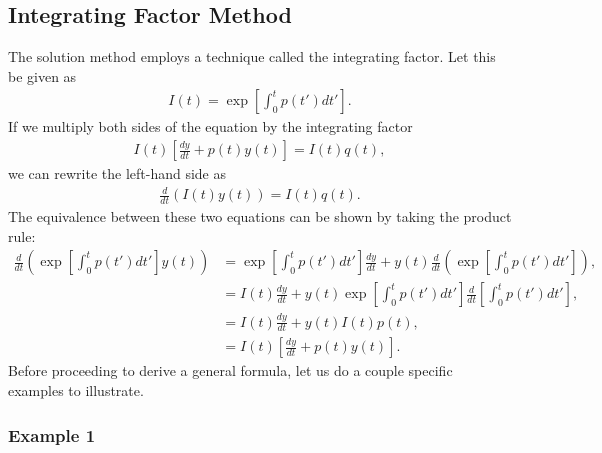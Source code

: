 \subsection{Integrating Factor Method}

The solution method employs a technique called the integrating factor. Let this be given as
\begin{align}
  I(t) = \exp \left[ \int_0^t p(t') dt' \right] .
\end{align}
If we multiply both sides of the equation by the integrating factor
\begin{align}
  I(t) \left[ \frac{dy}{dt} + p(t) y(t) \right] = I(t) q(t), \nonumber
\end{align}
we can rewrite the left-hand side as
\begin{align} \label{Eqn:odeSystems_FirstOrderLinear_withIntegratingFactor}
  \frac{d}{dt} \left( I(t) y(t) \right) = I(t) q(t). 
\end{align}
The equivalence between these two equations can be shown by taking the product rule:
\begin{align}
  \frac{d}{dt} \left( \exp \left[ \int_0^t p(t') dt' \right] y(t) \right) &= 
  \exp \left[ \int_0^t p(t') dt' \right] \frac{dy}{dt} + y(t) \frac{d}{dt} \left( \exp \left[ \int_0^t p(t') dt' \right] \right) ,  \nonumber \\
  &= I(t) \frac{dy}{dt} + y(t) \exp \left[ \int_0^t p(t') dt' \right] \frac{d}{dt} \left[ \int_0^t p(t') dt' \right], \nonumber  \\
  &= I(t) \frac{dy}{dt} + y(t) I(t) p(t), \nonumber  \\
  &= I(t) \left[ \frac{dy}{dt} + p(t) y(t) \right] . \nonumber
\end{align}
Before proceeding to derive a general formula, let us do a couple specific examples to illustrate. 

\subsubsection{Example 1}

